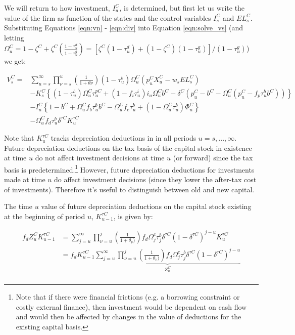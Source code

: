 \documentclass[article,11pt,letterpaper,fleqn]{article}
\theoremstyle{definition}
\numberwithin{equation}{section}
\begin{document}
We will return to how investment, $I^{C}_{u}$, is determined, but first let us write the value of the firm as function of the states and the control variables $I^{C}_{s}$ and $EL^{C}_{s}$.  Substituting Equations \ref{eqn:vn} - \ref{eqn:div} into Equation \ref{eqn:solve_vs}  (and letting $\Omega^{C}_{u}=1 - \zeta^{C} + \zeta^{C}\left(\frac{1-\tau^{d}_{u}}{1-\tau^{g}_{u}}\right) = \left[\zeta^{C}(1-\tau^{d}_{u}) + (1-\zeta^{C})(1-\tau^{g}_{u})\right]/(1-\tau^{g}_{u})$) we get:

\begin{equation}
\label{eqn:vs}
\begin{split}
V^{C}_{s} = &  \sum_{u=s}^{\infty} \prod_{\nu=s}^{u}\left(\frac{1}{1+\theta{\nu}}\right) (1-\tau^{b}_{u})\Omega^{C}_{u}(p^{C}_{u}X^{C}_{u}-w_{s}EL^{C}_{s})  \\ 
 & - K^{C}_{s} \left\{(1-\tau^{b}_{u})\Omega^{C}_{u}\tau^{pC}_{u}+(1-f_{i}\tau^{i}_{u})i_{u}\Omega^{C}_{u}b^{C}-\delta^{C}(p^{C}_{u}-b^{C}-\Omega^{C}_{u}(p^{C}_{u}-f_{p}\tau^{b}_{u}b^{C}))\right\}  \\
 & - I^{C}_{u}\left\{1-b^{C}+\Omega^{C}_{u}f_{b}\tau^{b}_{u}b^{C}-\Omega^{C}_{u}f_{e}\tau^{b}_{u} + (1-\Omega^{C}_{u}\tau^{b}_{u})\Phi^{C}_{u}\right\} \\
 & - \Omega^{C}_{u}f_{d}\tau^{b}_{u}\delta^{\tau C}K^{\tau C}_{u}
\end{split}
\end{equation}

Note that $K^{\tau C}_{u}$ tracks depreciation deductions in in all periods $u=s,...,\infty$.  Future depreciation deductions on the tax basis of the capital stock in existence at time $u$ do not affect investment decisions at time $u$ (or forward) since the tax basis is predetermined.\footnote{Note that if there were financial frictions (e.g. a borrowing constraint or costly external finance), then investment would be dependent on cash flow and would then be affected by changes in the value of deductions for the existing capital basis.}  However, future depreciation deductions for investments made at time $u$ do affect investment decisions (since they lower the after-tax cost of investments).  Therefore it's useful to distinguish between old and new capital. 

The time $u$ value of future depreciation deductions on the capital stock existing at the beginning of period $u$, $K^{\tau C}_{u-1}$, is given by: 

\begin{equation}
\label{eqn:z}
\begin{split}
f_{d}Z^{C}_{u}K^{\tau C}_{u-1} &=  \sum^{\infty}_{j=u} \prod_{\nu=u}^{j} \left(\frac{1}{1+\theta_{\nu})}\right)f_{d}\Omega^{c}_{j}\tau^{b}_{j}\delta^{\tau C}(1-\delta^{\tau C})^{j-u}K^{\tau C}_{u} \\
&= f_{d} K^{\tau C}_{u-1} \underbrace{\sum^{\infty}_{j=u} \prod_{\nu=u}^{j} \left(\frac{1}{1+\theta_{\nu})}\right)f_{d}\Omega^{c}_{j}\tau^{b}_{j}\delta^{\tau C}(1-\delta^{\tau C})^{j-u}}_{Z^{C}_{u}} \\
\end{split}
\end{equation}
\end{document}
